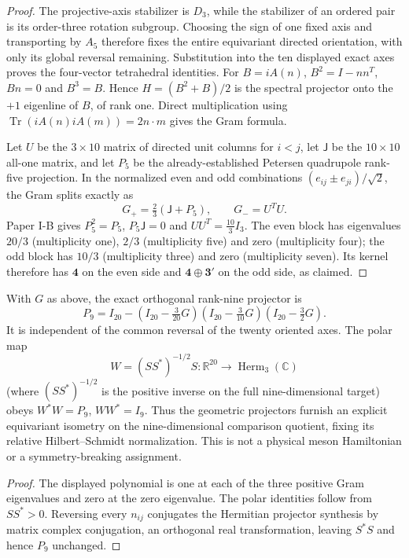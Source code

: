 \documentclass[11pt]{article}
\begin{document}
\begin{proof}
The projective-axis stabilizer is $D_3$, while the stabilizer of
an ordered pair is its order-three rotation subgroup.  Choosing the
sign of one fixed axis and transporting by $A_5$ therefore fixes the
entire equivariant directed orientation, with only its global reversal
remaining. Substitution into the ten displayed exact axes proves the
four-vector tetrahedral identities. For $B=iA(n)$, $B^2=I-nn^T$,
$Bn=0$ and $B^3=B$. Hence $H=(B^2+B)/2$ is the spectral projector
onto the $+1$ eigenline of $B$, of rank one. Direct multiplication
using $\operatorname{Tr}(iA(n)iA(m))=2n\cdot m$ gives the Gram formula.

Let $U$ be the $3\times10$ matrix of directed unit columns for $i<j$,
let $\mathsf J$ be the $10\times10$ all-one matrix, and let $P_5$ be
the already-established Petersen quadrupole rank-five projection.
In the normalized even and odd combinations
$(e_{ij}\pm e_{ji})/\sqrt2$, the Gram splits exactly as
\[
 \boxed{G_+=\tfrac23(\mathsf J+P_5),\qquad G_-=U^TU.}
\]
Paper I-B gives $P_5^2=P_5$, $P_5\mathsf J=0$ and
$UU^T=\tfrac{10}{3}I_3$.  The even block has eigenvalues $20/3$
(multiplicity one), $2/3$ (multiplicity five) and zero (multiplicity
four); the odd block has $10/3$ (multiplicity three) and zero
(multiplicity seven). Its kernel therefore has $\mathbf4$ on the
even side and $\mathbf4\oplus\mathbf3'$ on the odd side, as claimed.
\end{proof}

\begin{corollary}
\label{p1:cor:cc12-nonet-projector-polynomial}
With $G$ as above, the exact orthogonal rank-nine projector is
\[
 \boxed{P_9=I_{20}-
   (I_{20}-\tfrac3{20}G)
   (I_{20}-\tfrac3{10}G)
   (I_{20}-\tfrac32G).}
\]
It is independent of the common reversal of the twenty oriented axes.
The polar map
\[
 W=(SS^*)^{-1/2}S:\mathbb R^{20}\longrightarrow
 \operatorname{Herm}_3(\mathbb C)
\]
(where $(SS^*)^{-1/2}$ is the positive inverse on the full
nine-dimensional target) obeys $W^*W=P_9$, $WW^*=I_9$.
Thus the geometric projectors furnish an explicit equivariant isometry
on the nine-dimensional comparison quotient, fixing its relative
Hilbert--Schmidt normalization. This is not a physical meson
Hamiltonian or a symmetry-breaking assignment.
\end{corollary}
\begin{proof}
The displayed polynomial is one at each of the three positive Gram
eigenvalues and zero at the zero eigenvalue. The polar identities
follow from $SS^*>0$. Reversing every $n_{ij}$ conjugates the
Hermitian projector synthesis by matrix complex conjugation, an
orthogonal real transformation, leaving $S^*S$ and hence $P_9$
unchanged.
\end{proof}
\end{document}
